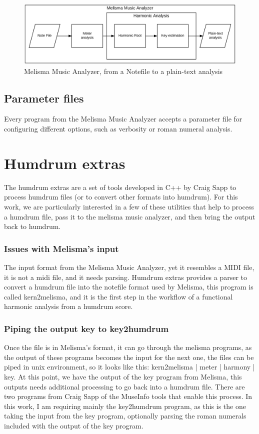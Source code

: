     \begin{figure}[ht]
      \centering
        \includegraphics[width=1.0\textwidth]{04-methodology/figures/2}
      \caption{Melisma Music Analyzer, from a Notefile to a plain-text analysis}
      \label{fig:software_stack2}
    \end{figure}

  \subsection{Parameter files}
    Every program from the Melisma Music Analyzer accepts a parameter file for configuring different options, such as verbosity or roman numeral analysis.
\section{Humdrum extras}
  The humdrum extras are a set of tools developed in C++ by Craig Sapp to process humdrum files (or to convert other formats into humdrum). For this work, we are particularly interested in a few of these utilities that help to process a humdrum file, pass it to the melisma music analyzer, and then bring the output back to humdrum.
  \subsubsection{Issues with Melisma's input}
    The input format from the Melisma Music Analyzer, yet it resembles a MIDI file, it is not a midi file, and it needs parsing. Humdrum extras provides a parser to convert a humdrum file into the notefile format used by Melisma, this program is called kern2melisma, and it is the first step in the workflow of a functional harmonic analysis from a humdrum score.
  \subsubsection{Piping the output key to key2humdrum}
    Once the file is in Melisma's format, it can go through the melisma programs, as the output of these programs becomes the input for the next one, the files can be piped in unix environment, so it looks like this: kern2melisma | meter | harmony | key.
    At this point, we have the output of the key program from Melisma, this outputs needs additional processing to go back into a humdrum file. There are two programs from Craig Sapp of the MuseInfo tools that enable this process. In this work, I am requiring mainly the key2humdrum program, as this is the one taking the input from the key program, optionally parsing the roman numerals included with the output of the key program.
